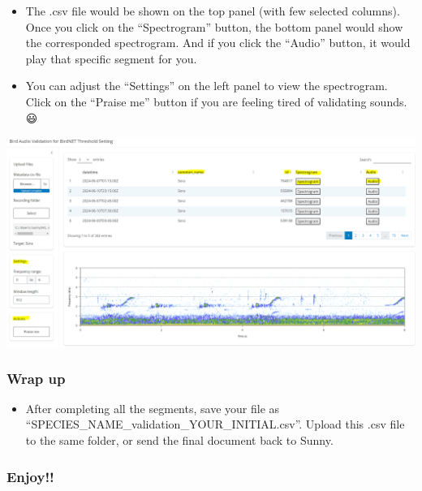 \documentclass[
]{article}
\providecommand{\tightlist}{%
  \setlength{\itemsep}{0pt}\setlength{\parskip}{0pt}}
\begin{document}
\begin{longtable}[]{@{}
  >{\raggedright\arraybackslash}p{}
  >{\raggedright\arraybackslash}p{}@{}}
\end{longtable}

\begin{itemize}
\item
  The .csv file would be shown on the top panel (with few selected
  columns). Once you click on the ``Spectrogram'' button, the bottom
  panel would show the corresponded spectrogram. And if you click the
  ``Audio'' button, it would play that specific segment for you.
\item
  You can adjust the ``Settings'' on the left panel to view the
  spectrogram. Click on the ``Praise me'' button if you are feeling
  tired of validating sounds. 😃
\end{itemize}

\includegraphics{images/clipboard-2147672079.png}

\subsubsection{Wrap up}\label{wrap-up}

\begin{itemize}
\tightlist
\item
  After completing all the segments, save your file as
  ``SPECIES\_NAME\_validation\_YOUR\_INITIAL.csv''. Upload this .csv
  file to the same folder, or send the final document back to Sunny.
\end{itemize}

\subsubsection{Enjoy!!}\label{enjoy}
\end{document}
